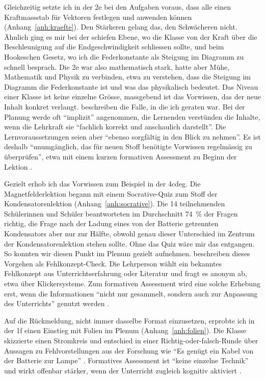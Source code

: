 \documentclass[12pt,a4paper]{article}
\begin{document}
Gleichzeitig setzte ich in der 2e bei den Aufgaben voraus, dass alle einen
Kraftmassstab für Vektoren festlegen und anwenden können
(Anhang~\ref{anh:kraefte}). Den Stärkeren gelang das, den Schwächeren nicht.
Ähnlich ging es mir bei der schiefen Ebene, wo die Klasse von der Kraft über
die Beschleunigung auf die Endgeschwindigkeit schliessen sollte, und beim
Hookeschen Gesetz, wo ich die Federkonstante als Steigung im Diagramm zu
schnell besprach. Die 2e war also mathematisch stark, hatte aber Mühe,
Mathematik und Physik zu verbinden, etwa zu verstehen, dass die Steigung im
Diagramm die Federkonstante ist und was das physikalisch bedeutet. Das Niveau einer Klasse ist keine
einzelne Grösse, massgebend ist das Vorwissen, das der neue Inhalt konkret
verlangt. \Textcite[2]{scheckerduit2018} beschreiben die Falle, in die ich
geraten war. Bei der Planung werde oft \enquote{implizit} angenommen, die
Lernenden verstünden die Inhalte, wenn die Lehrkraft sie \enquote{fachlich
korrekt und anschaulich darstellt}. Die Lernvoraussetzungen seien aber
\enquote{ebenso sorgfältig in den Blick zu nehmen}. Es ist deshalb
\enquote{unumgänglich, das für neuen Stoff benötigte Vorwissen regelmässig zu
überprüfen}, etwa mit einem kurzen formativen Assessment zu Beginn der Lektion
\parencite[78]{greutmannstern2021}.

Gezielt erhob ich das Vorwissen zum Beispiel in der 4cdeg. Die
Magnetfelderlektion begann mit einem Socrative-Quiz zum Stoff der
Kondensatorenlektion (Anhang~\ref{anh:socrative}). Die 14 teilnehmenden
Schülerinnen und Schüler beantworteten im Durchschnitt 74~\% der Fragen
richtig, die Frage nach der Ladung eines von der Batterie getrennten
Kondensators aber nur zur Hälfte, obwohl genau dieser Unterschied im Zentrum
der Kondensatorenlektion stehen sollte. Ohne das Quiz wäre mir das entgangen.
So konnten wir diesen Punkt im Plenum gezielt aufnehmen.
\Textcite[125--126]{hoferschalk2021} beschreiben dieses Vorgehen als
Fehlkonzept-Check. Die Lehrperson wählt ein bekanntes Fehlkonzept aus
Unterrichtserfahrung oder Literatur und fragt es anonym ab, etwa über
Klickersysteme. Zum formativen Assessment wird eine solche Erhebung erst, wenn
die Informationen \enquote{nicht nur gesammelt, sondern auch zur Anpassung des
Unterrichts} genutzt werden \parencite[125]{hoferschalk2021}.

Auf die Rückmeldung, nicht immer dasselbe Format einzusetzen, erprobte ich in
der 1f einen Einstieg mit Folien im Plenum (Anhang~\ref{anh:folien}). Die
Klasse skizzierte einen Stromkreis und entschied in einer
Richtig-oder-falsch-Runde über Aussagen zu Fehlvorstellungen aus der Forschung
wie \enquote{Es genügt ein Kabel von der Batterie zur Lampe}
\parencite[116]{wilhelmhopf2018}. Formatives Assessment ist \enquote{keine einzelne
Technik} \parencite[124]{hoferschalk2021} und wirkt offenbar stärker, wenn der
Unterricht zugleich kognitiv aktiviert \parencite[100]{lipowsky2020}.
\end{document}
